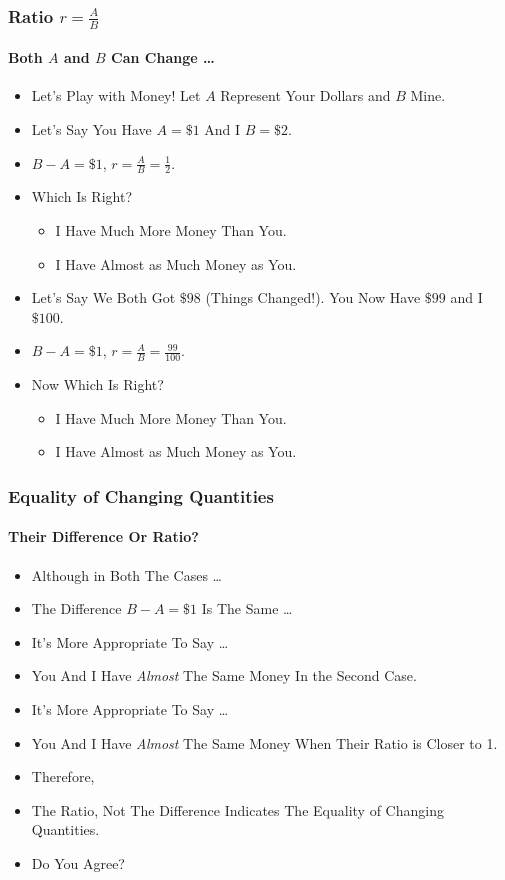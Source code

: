 \documentclass{beamer}
\begin{document}
\begin{frame}
\frametitle{Ratio $r=\frac{A}{B}$}
\framesubtitle{Both $A$ and $B$ Can Change \dots}
\label{slide:abyb}
\begin{itemize}
\pause
\item Let's Play with Money! Let $A$ Represent Your Dollars and $B$ Mine.
\pause
\item Let's Say You Have $A=\$1$ And I $B=\$2$. 
\item $B-A=\$1$, $r=\frac{A}{B}=\frac{1}{2}$.
\pause
\item Which Is Right?
\begin{itemize}
\pause
\item I Have Much More Money Than You.
\item I Have Almost as Much Money as You.
\end{itemize}
\pause
\item Let's Say We Both Got $\$98$ (Things Changed!). You Now Have $\$99$ and I $\$100$. 
\item $B-A=\$1$, $r=\frac{A}{B}=\frac{99}{100}$.
\item Now Which Is Right?
\begin{itemize}
\pause
\item I Have Much More Money Than You.
\item I Have Almost as Much Money as You.
\end{itemize}
\end{itemize}
\end{frame}

\begin{frame}
\frametitle{Equality of Changing Quantities}
\framesubtitle{Their Difference Or Ratio?}
\label{slide:difforratio}
\begin{itemize}
\item Although in Both The Cases \dots 
\item The Difference $B-A=\$1$ Is The Same \dots
\pause
\item It's \alert{More Appropriate} To Say \dots
\item You And I Have \textit{Almost} The Same Money \alert{In the Second Case}.
\pause
\item It's \alert{More Appropriate} To Say \dots
\item You And I Have \textit{Almost} The Same Money \alert{When Their Ratio is Closer to 1}.
\pause
\item Therefore,
\item \alert{The Ratio, Not The Difference} Indicates \alert{The Equality of Changing Quantities}.
\pause
\item {\Large \alert{Do You Agree?}}
\end{itemize}
\end{frame}
\end{document}
